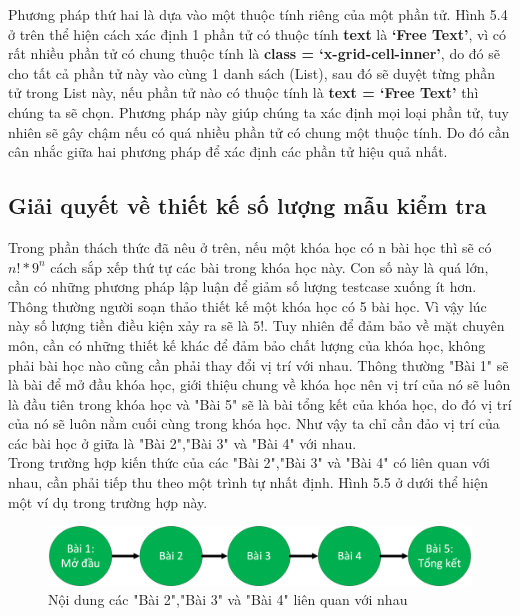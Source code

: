 Phương pháp thứ hai là dựa vào một thuộc tính riêng của một phần tử. Hình 5.4 ở trên thể hiện cách xác định 1 phần tử có thuộc tính \textbf{text} là \textbf{‘Free Text’}, vì có rất nhiều phần tử có chung thuộc tính là \textbf{class = ‘x-grid-cell-inner’}, do đó sẽ cho tất cả phần tử này vào cùng 1 danh sách (List), sau đó sẽ duyệt từng phần tử trong List này, nếu phần tử nào có thuộc tính là \textbf{text = ‘Free Text’} thì chúng ta sẽ chọn. Phương pháp này giúp chúng ta xác định mọi loại phần tử, tuy nhiên sẽ gây chậm nếu có quá nhiều phần tử có chung một thuộc tính. Do đó cần cân nhắc giữa hai phương pháp để xác định các phần tử hiệu quả nhất.

\newpage 

\subsection{Giải quyết về thiết kế số lượng mẫu kiểm tra}


Trong phần thách thức đã nêu ở trên, nếu một khóa học có n bài học thì sẽ có $n! * 9^n$ cách sắp xếp thứ tự các bài trong khóa học này. Con số này là quá lớn, cần có những phương pháp lập luận để giảm số lượng testcase xuống ít hơn.\\

Thông thường người soạn thảo thiết kế một khóa học có 5 bài học. Vì vậy lúc này số lượng tiền điều kiện xảy ra sẽ là $5!$. Tuy nhiên để đảm bảo về mặt chuyên môn, cần có những thiết kế khác để đảm bảo chất lượng của khóa học, không phải bài học nào cũng cần phải thay đổi vị trí với nhau. Thông thường "Bài 1" sẽ là bài để mở đầu khóa học, giới thiệu chung về khóa học nên vị trí của nó sẽ luôn là đầu tiên trong khóa học và "Bài 5" sẽ là bài tổng kết của khóa học, do đó vị trí của nó sẽ luôn nằm cuối cùng trong khóa học. Như vậy ta chỉ cần đảo vị trí của các bài học ở giữa là "Bài 2","Bài 3" và "Bài 4" với nhau.\\

Trong trường hợp kiến thức của các "Bài 2","Bài 3" và "Bài 4" có liên quan với nhau, cần phải tiếp thu theo một trình tự nhất định. Hình 5.5 ở dưới thể hiện một ví dụ trong trường hợp này.

\begin{center}
	\begin{figure}[htp]
		\begin{center}
			\includegraphics[width=16cm]{Chapter5/Pictures/picture55.png}
		\end{center}
		\caption{Nội dung các "Bài 2","Bài 3" và "Bài 4" liên quan với nhau}
		\label{refhinhchuong66}
	\end{figure}
\end{center}

